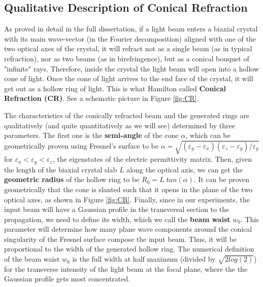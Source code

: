 \documentclass[11pt, a4paper, twoside]{article} %
\begin{document}
\subsection*{Qualitative Description of Conical Refraction}
As proved in detail in the full dissertation, if a light beam enters a biaxial crystal with its main wave-vector (in the Fourier decomposition) aligned with one of the two optical axes of the crystal, it will refract not as a single beam (as in typical refraction), nor as two beams (as in birefringence), but as a conical bouquet of "infinite" rays. Therefore, inside the crystal the light beam will open into a hollow cone of light. Once the cone of light arrives to the end face of the crystal, it will get out as a hollow ring of light. This is what Hamilton called {\bf Conical Refraction (CR)}. See a schematic picture in Figure \ref{fig:CR}.

The characteristics of the conically refracted beam and the generated rings are qualitatively (and quite quantitatively as we will see) determined by three parameters. The first one is the {\bf semi-angle} of the cone $\alpha$, which can be geometrically proven using Fresnel's surface to be $\alpha=\sqrt{(\varepsilon_y-\varepsilon_x)(\varepsilon_z-\varepsilon_y)/\varepsilon_y}$ for $\varepsilon_x<\varepsilon_y<\varepsilon_z$, the eigenstates of the electric permittivity matrix. Then, given the length of the biaxial crystal slab $L$ along the optical axis, we can get the {\bf geometric radius} of the hollow ring to be $R_0=L\;tan(\alpha)$. It can be proven geometrically that the cone is slanted such that it opens in the plane of the two optical axes, as shown in Figure \ref{fig:CR}. Finally, since in our experiments, the input beam will have a Gaussian profile in the transversal section to the propagation, we need to define its width, which we call the {\bf beam waist} $w_0$. This parameter will determine how many plane wave components around the conical singularity of the Fresnel surface compose the input beam. Thus, it will be proportional to the width of the generated hollow ring. The numerical definition of the beam waist $w_0$ is the full width at half maximum (divided by $\sqrt{2log(2)}$) for the transverse intensity of the light beam at the focal plane, where the the Gaussian profile gets most concentrated.
\end{document}
